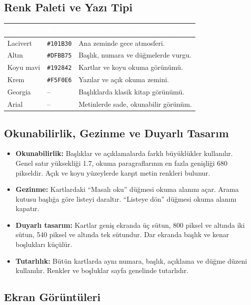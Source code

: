 \documentclass[12pt,a4paper]{article}
\begin{document}
\subsection{Renk Paleti ve Yazı Tipi}
\begin{center}
\begin{tabular}{@{}llp{6.4cm}@{}}
\toprule
\rowcolor{ana}\textcolor{white}{\textbf{Ad}} & \textcolor{white}{\textbf{Kod}} & \textcolor{white}{\textbf{Nerede / neden kullandınız?}} \\
\midrule
Lacivert & \texttt{\#101B30} & Ana zeminde gece atmosferi. \\
Altın & \texttt{\#DFBB75} & Başlık, numara ve düğmelerde vurgu. \\
Koyu mavi & \texttt{\#192842} & Kartlar ve koyu okuma görünümü. \\
Krem & \texttt{\#F5F0E6} & Yazılar ve açık okuma zemini. \\
Georgia & -- & Başlıklarda klasik kitap görünümü. \\
Arial & -- & Metinlerde sade, okunabilir görünüm. \\
\bottomrule
\end{tabular}
\end{center}

\subsection{Okunabilirlik, Gezinme ve Duyarlı Tasarım}
\begin{itemize}
  \item \textbf{Okunabilirlik:} Başlıklar ve açıklamalarda farklı büyüklükler kullanılır. Genel satır yüksekliği 1.7, okuma paragraflarının en fazla genişliği 680 pikseldir. Açık ve koyu yüzeylerde karşıt metin renkleri bulunur.
  \item \textbf{Gezinme:} Kartlardaki “Masalı oku” düğmesi okuma alanını açar. Arama kutusu başlığa göre listeyi daraltır. “Listeye dön” düğmesi okuma alanını kapatır.
  \item \textbf{Duyarlı tasarım:} Kartlar geniş ekranda üç sütun, 800 piksel ve altında iki sütun, 540 piksel ve altında tek sütundur. Dar ekranda başlık ve kenar boşlukları küçülür.
  \item \textbf{Tutarlılık:} Bütün kartlarda aynı numara, başlık, açıklama ve düğme düzeni kullanılır. Renkler ve boşluklar sayfa genelinde tutarlıdır.
\end{itemize}

\clearpage
\subsection{Ekran Görüntüleri}
\end{document}
